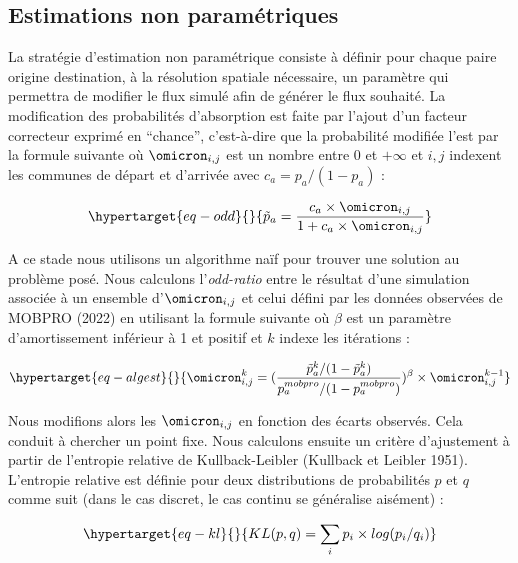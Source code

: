 \documentclass[
  10pt,
  a4paper,
  numbers=noendperiod,
  DIV=9]{scrreprt}
\begin{document}
\hypertarget{sec-estnp}{%
\subsection{Estimations non paramétriques}\label{sec-estnp}}

La stratégie d'estimation non paramétrique consiste à définir pour
chaque paire origine destination, à la résolution spatiale nécessaire,
un paramètre qui permettra de modifier le flux simulé afin de générer le
flux souhaité. La modification des probabilités d'absorption est faite
par l'ajout d'un facteur correcteur exprimé en ``chance'', c'est-à-dire
que la probabilité modifiée l'est par la formule suivante où
\(\omicron_{i,j}\) est un nombre entre \(0\) et \(+\infty\) et \(i,j\)
indexent les communes de départ et d'arrivée avec \(c_a = p_a/(1-p_a)\)
:

\begin{equation}\protect\hypertarget{eq-odd}{}{
\tilde{p}_a = \frac{c_a \times \omicron_{i,j}} {1+c_a \times \omicron_{i,j}} 
}\label{eq-odd}\end{equation}

A ce stade nous utilisons un algorithme naïf pour trouver une solution
au problème posé. Nous calculons l'\emph{odd-ratio} entre le résultat
d'une simulation associée à un ensemble d'\(\omicron_{i,j}\) et celui
défini par les données observées de MOBPRO (2022) en utilisant la
formule suivante où \(\beta\) est un paramètre d'amortissement inférieur
à 1 et positif et \(k\) indexe les itérations :

\begin{equation}\protect\hypertarget{eq-algest}{}{
\omicron^k_{i,j} = (\frac{\tilde{p}^k_a/(1-\tilde{p}^k_a)}{
p^{mobpro}_a/(1-p^{mobpro}_a)})^\beta \times \omicron^{k-1}_{i,j}
}\label{eq-algest}\end{equation}

Nous modifions alors les \(\omicron_{i,j}\) en fonction des écarts
observés. Cela conduit à chercher un point fixe. Nous calculons ensuite
un critère d'ajustement à partir de l'entropie relative de
Kullback-Leibler (Kullback et Leibler 1951). L'entropie relative est
définie pour deux distributions de probabilités \(p\) et \(q\) comme
suit (dans le cas discret, le cas continu se généralise aisément) :

\begin{equation}\protect\hypertarget{eq-kl}{}{
KL(p,q) = \sum_{i}p_i \times log(p_i/q_i)
}\label{eq-kl}\end{equation}
\end{document}
